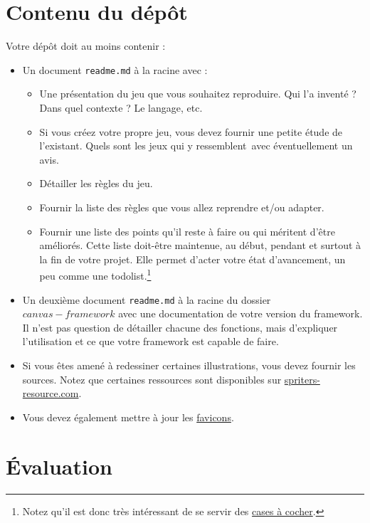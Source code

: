 \documentclass[11pt, a4paper]{article}
\begin{document}
\clearpage
\section{Contenu du dépôt}
\label{La documentation}

Votre dépôt doit au moins contenir :
\begin{itemize}
  \item Un document \verb!readme.md! à la racine avec :
        \begin{itemize}
          \item Une présentation du jeu que vous souhaitez reproduire. Qui l'a inventé ? Dans quel contexte ? Le langage, etc.
          \item Si vous créez votre propre jeu, vous devez fournir une petite étude de l'existant. Quels sont les jeux qui y ressemblent~avec éventuellement un avis.
          \item Détailler les règles du jeu.
          \item Fournir la liste des règles que vous allez reprendre et/ou adapter.
          \item Fournir une liste des points qu'il reste à faire ou qui méritent d'être améliorés. Cette liste doit-être maintenue, au début, pendant et surtout à la fin de votre projet. Elle permet d'acter votre état d'avancement, un peu comme une todolist.\footnote{Notez qu'il est donc très intéressant de se servir des \href{https://stackoverflow.com/questions/47344571/how-to-draw-checkbox-or-tick-mark-in-github-markdown-table}{cases à cocher}.}
        \end{itemize}
  \item Un deuxième document \verb!readme.md! à la racine du dossier $canvas-framework$ avec une documentation de votre version du framework. Il n'est pas question de détailler chacune des fonctions, mais d'expliquer l'utilisation et ce que votre framework est capable de faire.
  \item Si vous êtes amené à redessiner certaines illustrations, vous devez fournir les sources. Notez que certaines ressources sont disponibles sur \href{https://www.spriters-resource.com}{spriters-resource.com}.
  \item Vous devez également mettre à jour les \href{https://realfavicongenerator.net}{favicons}.
\end{itemize}

\section{Évaluation}
\end{document}
